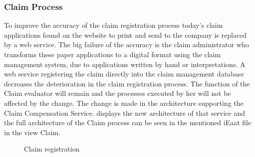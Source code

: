 \subsubsection{Claim Process}
To improve the accuracy of the claim registration process today's claim applications found on the website to print and send to the company is replaced by a web service. The big failure of the accuracy is the claim administrator who transforms these paper applications to a digital format using the claim management system, due to applications written by hand or interpretations. A web service registering the claim directly into the claim management database decreases the deterioration in the claim registration process. The function of the Claim evaluator will remain and the processes executed by her will not be affected by the change. The change is made in the architecture supporting the Claim Compensation Service.  displays the new architecture of that service and the full architecture of the Claim process can be seen in the mentioned iEaat file in the view Claim.
\begin{center}
	\begin{figure}[H]
		\centering
		\setlength\fboxsep{7pt}
		\setlength\fboxrule{0.5pt}
		\caption{Claim registration}
		\label{fig:map_claim_tobe}
	\end{figure}
\end{center}
